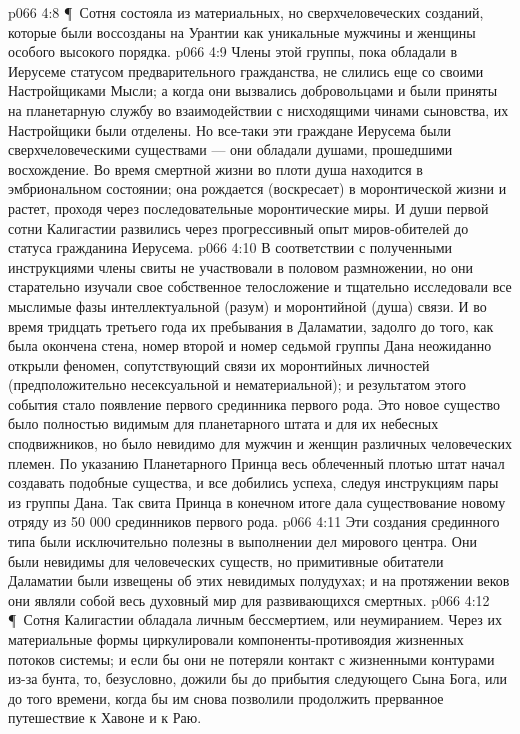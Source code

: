 \vs p066 4:8 \P\ \bibnobreakspace Сотня состояла из материальных, но сверхчеловеческих созданий, которые были воссозданы на Урантии как уникальные мужчины и женщины особого высокого порядка.
\vs p066 4:9 Члены этой группы, пока обладали в Иерусеме статусом предварительного гражданства, не слились еще со своими Настройщиками Мысли; а когда они вызвались добровольцами и были приняты на планетарную службу во взаимодействии с нисходящими чинами сыновства, их Настройщики были отделены. Но все\hyp{}таки эти граждане Иерусема были сверхчеловеческими существами --- они обладали душами, прошедшими восхождение. Во время смертной жизни во плоти душа находится в эмбриональном состоянии; она рождается (воскресает) в моронтической жизни и растет, проходя через последовательные моронтические миры. И души первой сотни Калигастии развились через прогрессивный опыт миров\hyp{}обителей до статуса гражданина Иерусема.
\vs p066 4:10 В соответствии с полученными инструкциями члены свиты не участвовали в половом размножении, но они старательно изучали свое собственное телосложение и тщательно исследовали все мыслимые фазы интеллектуальной (разум) и моронтийной (душа) связи. И во время тридцать третьего года их пребывания в Даламатии, задолго до того, как была окончена стена, номер второй и номер седьмой группы Дана неожиданно открыли феномен, сопутствующий связи их моронтийных личностей (предположительно несексуальной и нематериальной); и результатом этого события стало появление первого срединника первого рода. Это новое существо было полностью видимым для планетарного штата и для их небесных сподвижников, но было невидимо для мужчин и женщин различных человеческих племен. По указанию Планетарного Принца весь облеченный плотью штат начал создавать подобные существа, и все добились успеха, следуя инструкциям пары из группы Дана. Так свита Принца в конечном итоге дала существование новому отряду из 50 000 срединников первого рода.
\vs p066 4:11 Эти создания срединного типа были исключительно полезны в выполнении дел мирового центра. Они были невидимы для человеческих существ, но примитивные обитатели Даламатии были извещены об этих невидимых полудухах; и на протяжении веков они являли собой весь духовный мир для развивающихся смертных.
\vs p066 4:12 \P\ \bibnobreakspace Сотня Калигастии обладала личным бессмертием, или неумиранием. Через их материальные формы циркулировали компоненты\hyp{}противоядия жизненных потоков системы; и если бы они не потеряли контакт с жизненными контурами из\hyp{}за бунта, то, безусловно, дожили бы до прибытия следующего Сына Бога, или до того времени, когда бы им снова позволили продолжить прерванное путешествие к Хавоне и к Раю.
